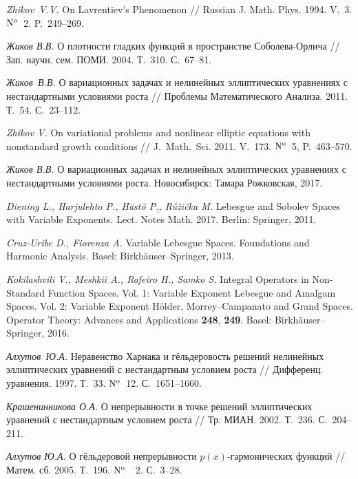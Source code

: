  \emph{Zhikov~V.V.} On Lavrentiev's Phenomenon // Russian J. Math. Phys. 1994. V.~3.  ${\rm N^o}$\, 2. P.~249--269.


 \emph{Жиков В.В.} О плотности гладких функций в пространстве Соболева-Орлича // Зап. научн. сем. ПОМИ. 2004. Т.~310. С.~67--81.

 \emph{Жиков~В.В. } О вариационных задачах и нелинейных эллиптических уравнениях с нестандартными условиями роста // Проблемы Математического Анализа. 2011. Т.~54. С.~23--112.

 \emph{Zhikov V.} On variational problems and nonlinear elliptic equations with nonstandard growth conditions // J.~Math.~Sci. 2011. V.~173. ${\rm N^o}$\, 5, P.~463--570.

\emph{Жиков В.В.} О вариационных задачах и нелинейных эллиптических уравнениях с нестандартными условиями роста. Новосибирск: Тамара Рожковская, 2017.



 \emph{Diening L., Harjulehto P., H\"ast\"o P., R\r{u}\v{z}i\v{c}ka M.} Lebesgue and Sobolev Spaces with Variable Exponents. Lect. Notes Math. 2017. Berlin: Springer, 2011.

 \emph{Cruz-Uribe D., Fiorenza A.} Variable Lebesgue Spaces. Foundations and Harmonic Analysis. Basel:  Birkh\"auser--Springer,  2013.

 \emph{Kokilashvili V., Meshkii A., Rafeiro H., Samko S.} Integral Operators in Non-Standard Function Spaces. Vol. 1: Variable Exponent Lebesgue and Amalgam Spaces. Vol. 2: Variable Exponent H\"older, Morrey–Campanato and Grand Spaces. Operator Theory: Advances and Applications \textbf{248}, \textbf{249}. Basel: Birkh\"auser--Springer, 2016.




 \emph{Алхутов~Ю.А.} Неравенство Харнака и гёльдеровость решений нелинейных эллиптических уравнений с нестандартным условием роста // Дифференц. уравнения. 1997. Т.~33. ${\rm N^o}$\, 12.  С.~1651--1660.

  \emph{Крашенинникова О.А.} О непрерывности в точке решений эллиптических уравнений с нестандартным условием роста // Тр. МИАН. 2002.  Т.~236. С.~204--211.

 \emph{Алхутов Ю.А.} О гёльдеровой непрерывности $p(x)$-гармонических функций // Матем. сб. 2005. Т.~196. ${\rm N^o}$\, ~2. С.~3--28. %



